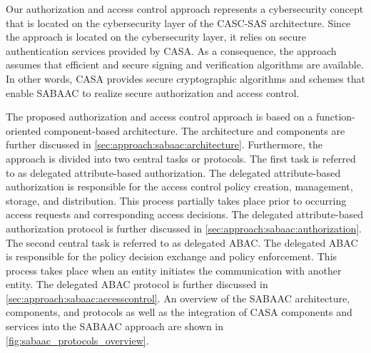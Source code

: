Our authorization and access control approach represents a cybersecurity concept that is located on the cybersecurity layer of the CASC-SAS architecture.
Since the approach is located on the cybersecurity layer, it relies on secure authentication services provided by CASA.
As a consequence, the approach assumes that efficient and secure signing and verification algorithms are available.
In other words, CASA provides secure cryptographic algorithms and schemes that enable SABAAC to realize secure authorization and access control.

The proposed authorization and access control approach is based on a function-oriented component-based architecture.
The architecture and components are further discussed in \autoref{sec:approach:sabaac:architecture}.
Furthermore, the approach is divided into two central tasks or protocols.
The first task is referred to as delegated attribute-based authorization.
The delegated attribute-based authorization is responsible for the access control policy creation, management, storage, and distribution.
This process partially takes place prior to occurring access requests and corresponding access decisions.
The delegated attribute-based authorization protocol is further discussed in \autoref{sec:approach:sabaac:authorization}.
The second central task is referred to as delegated ABAC.
The delegated ABAC is responsible for the policy decision exchange and policy enforcement.
This process takes place when an entity initiates the communication with another entity.
The delegated ABAC protocol is further discussed in \autoref{sec:approach:sabaac:accesscontrol}.
An overview of the SABAAC architecture, components, and protocols as well as the integration of CASA components and services into the SABAAC approach are shown in \autoref{fig:sabaac_protocols_overview}.
